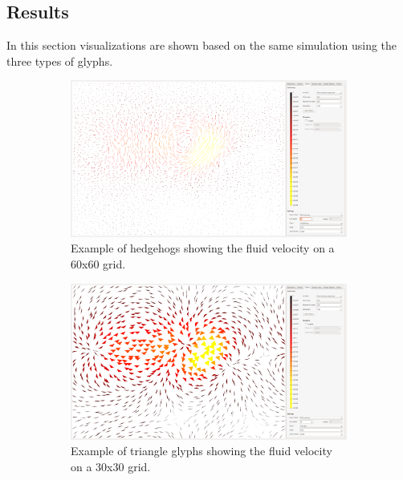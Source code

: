 \subsection{Results} %
\label{sec:results}
In this section visualizations are shown based on the same simulation using the three types of glyphs.
\begin{figure}[tb]
	\centering
	\begin{subfigure}{0.6\textwidth}
	\centering
	\includegraphics[width=\textwidth, trim={35px 30px 430px 30px},clip]{img/glyphs/hedgehogs.png}
	\caption{Example of hedgehogs showing the fluid velocity on a 60x60 grid.}
	\label{fig:glyphs:hedgehogs}
	\end{subfigure}
	\begin{subfigure}{0.6\textwidth}
		\centering
		\includegraphics[width=\textwidth, trim={35px 30px 430px 30px},clip]{img/glyphs/triangles.png}
		\caption{Example of triangle glyphs showing the fluid velocity on a 30x30 grid.}
		\label{fig:glyphs:triangles}
	\end{subfigure}
	\begin{subfigure}{0.6\textwidth}

\end{subfigure}
\end{figure}
